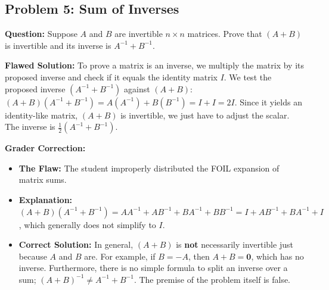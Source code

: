 \documentclass[12pt]{article}
\begin{document}
\subsection{Problem 5: Sum of Inverses}
\textbf{Question:} Suppose $A$ and $B$ are invertible $n \times n$ matrices. Prove that $(A + B)$ is invertible and its inverse is $A^{-1} + B^{-1}$.

\textbf{Flawed Solution:}
To prove a matrix is an inverse, we multiply the matrix by its proposed inverse and check if it equals the identity matrix $I$.
We test the proposed inverse $(A^{-1} + B^{-1})$ against $(A + B)$:
$(A + B)(A^{-1} + B^{-1}) = A(A^{-1}) + B(B^{-1}) = I + I = 2I$.
Since it yields an identity-like matrix, $(A+B)$ is invertible, we just have to adjust the scalar. The inverse is $\frac{1}{2}(A^{-1} + B^{-1})$.

\textbf{Grader Correction:}
\begin{itemize}
    \item \textbf{The Flaw:} The student improperly distributed the FOIL expansion of matrix sums.
    \item \textbf{Explanation:} $(A+B)(A^{-1}+B^{-1}) = AA^{-1} + AB^{-1} + BA^{-1} + BB^{-1} = I + AB^{-1} + BA^{-1} + I$, which generally does not simplify to $I$.
    \item \textbf{Correct Solution:} In general, $(A + B)$ is \textbf{not} necessarily invertible just because $A$ and $B$ are. For example, if $B = -A$, then $A+B = \mathbf{0}$, which has no inverse. Furthermore, there is no simple formula to split an inverse over a sum; $(A+B)^{-1} \neq A^{-1} + B^{-1}$. The premise of the problem itself is false.
\end{itemize}
\end{document}
